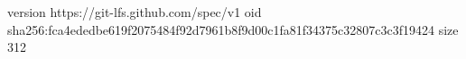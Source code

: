 version https://git-lfs.github.com/spec/v1
oid sha256:fca4ededbe619f2075484f92d7961b8f9d00c1fa81f34375c32807c3c3f19424
size 312
